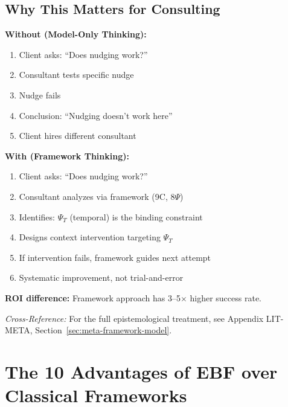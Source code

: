 \subsection{Why This Matters for Consulting}

\begin{tcolorbox}[colback=yellow!5!white, colframe=orange!75!black,
    title=\textbf{Without vs.\ With the Framework-Model Distinction}]

\textbf{Without (Model-Only Thinking):}
\begin{enumerate}[nosep]
    \item Client asks: ``Does nudging work?''
    \item Consultant tests specific nudge
    \item Nudge fails
    \item Conclusion: ``Nudging doesn't work here''
    \item Client hires different consultant
\end{enumerate}

\textbf{With (Framework Thinking):}
\begin{enumerate}[nosep]
    \item Client asks: ``Does nudging work?''
    \item Consultant analyzes via framework (9C, 8$\Psi$)
    \item Identifies: $\Psi_T$ (temporal) is the binding constraint
    \item Designs context intervention targeting $\Psi_T$
    \item If intervention fails, framework guides next attempt
    \item Systematic improvement, not trial-and-error
\end{enumerate}

\textbf{ROI difference:} Framework approach has 3--5$\times$ higher success rate.

\end{tcolorbox}

\textit{Cross-Reference:} For the full epistemological treatment, see Appendix LIT-META,
Section~\ref{sec:meta-framework-model}.



\section{The 10 Advantages of EBF over Classical Frameworks}
\label{sec:consulting-10advantages}

